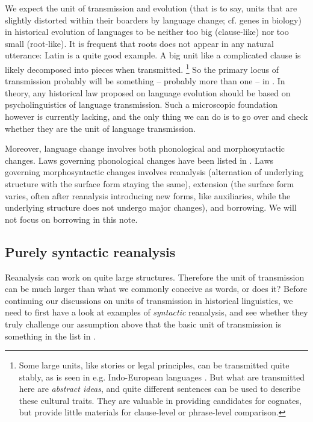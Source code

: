 \documentclass[a4paper, oneside, scheme=plain, 12pt]{article}
\newcommand*{\citechap}[1]{Ch.~{#1}}
\begin{document}
We expect the unit of transmission and evolution
(that is to say, units that are slightly distorted within their boarders by language change;
cf. genes in biology)
in historical evolution of languages
to be neither too big (clause-like) nor too small (root-like).
It is frequent that roots does not appear in any natural utterance:
Latin is a quite good example.
A big unit like a complicated clause is likely decomposed into pieces when transmitted.%
\footnote{
    Some large units, like stories or legal principles, can be transmitted quite stably,
    as is seen in e.g. Indo-European languages \citep[\citechap{2}]{fortson2011indo}.
    But what are transmitted here are \emph{abstract ideas},
    and quite different sentences can be used to describe these cultural traits.
    They are valuable in providing candidates for cognates,
    but provide little materials for clause-level or phrase-level comparison.
}
So the primary locus of transmission probably will be something -- probably more than one -- in .
In theory, any historical law proposed on language evolution 
should be based on psycholinguistics of language transmission.
Such a microscopic foundation however is currently lacking,
and the only thing we can do is to go over 
and check whether they are the unit of language transmission.

Moreover, language change involves both phonological and morphosyntactic changes.
Laws governing phonological changes have been listed in .
Laws governing morphosyntactic changes involves reanalysis (alternation of underlying structure with the surface form staying the same), extension (the surface form varies, often after reanalysis introducing new forms, like auxiliaries, while the underlying structure does not undergo major changes), and borrowing.
We will not focus on borrowing in this note.


\subsection{Purely syntactic reanalysis}\label{sec:syntactic-reanalysis}

Reanalysis can work on quite large structures.
Therefore the unit of transmission can be much larger than what we commonly conceive as words, or does it?
Before continuing our discussions on units of transmission in historical linguistics,
we need to first have a look at examples of \emph{syntactic} reanalysis,
and see whether they truly challenge our assumption above that
the basic unit of transmission is something in the list in .
\end{document}
